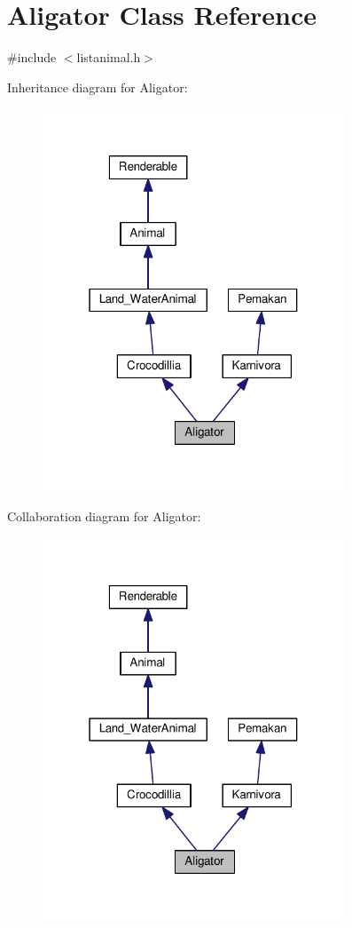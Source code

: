 \hypertarget{classAligator}{}\section{Aligator Class Reference}
\label{classAligator}


{\ttfamily \#include $<$listanimal.\+h$>$}



Inheritance diagram for Aligator\+:
\nopagebreak
\begin{figure}[H]
\begin{center}
\leavevmode
\includegraphics[width=256pt]{classAligator__inherit__graph}
\end{center}
\end{figure}


Collaboration diagram for Aligator\+:
\nopagebreak
\begin{figure}[H]
\begin{center}
\leavevmode
\includegraphics[width=256pt]{classAligator__coll__graph}
\end{center}
\end{figure}
